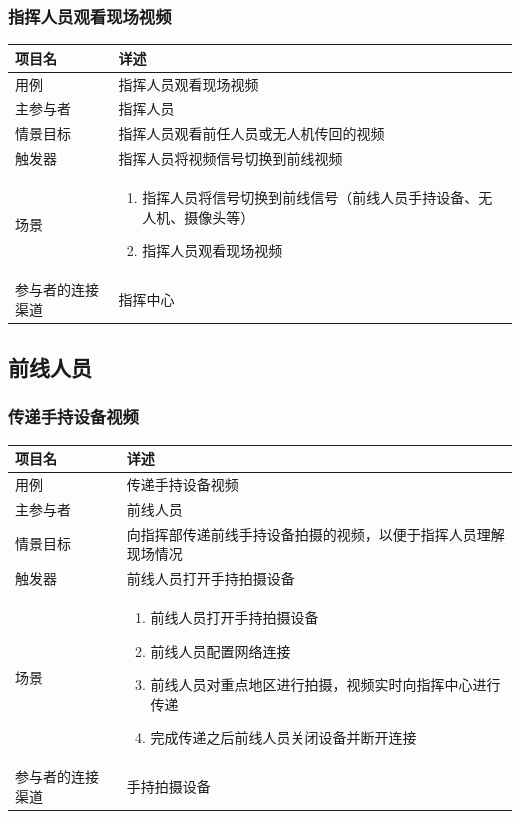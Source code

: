 \documentclass{ctexrep}
\begin{document}
\subsubsection{指挥人员观看现场视频}
\begin{longtable}{p{2cm} | p{10cm}}
\hline
项目名 & 详述 \\
\hline
\hline
用例 & 指挥人员观看现场视频\\
\hline
主参与者 & 指挥人员 \\
\hline
情景目标 &  指挥人员观看前任人员或无人机传回的视频\\
\hline
触发器 &  指挥人员将视频信号切换到前线视频\\
\hline
场景 & \begin{enumerate}
	\item 指挥人员将信号切换到前线信号（前线人员手持设备、无人机、摄像头等）
	\item 指挥人员观看现场视频
\end{enumerate} \\
\hline
参与者的连接渠道 & 指挥中心 \\
\hline
\end{longtable}


\subsection{前线人员}

\subsubsection{传递手持设备视频}
\begin{longtable}{p{2cm} | p{10cm}}
\hline
项目名 & 详述 \\
\hline
\hline
用例 & 传递手持设备视频 \\
\hline
主参与者 & 前线人员  \\
\hline
情景目标 & 向指挥部传递前线手持设备拍摄的视频，以便于指挥人员理解现场情况 \\
\hline
触发器 & 前线人员打开手持拍摄设备 \\
\hline
场景 & \begin{enumerate}
	\item 前线人员打开手持拍摄设备
	\item 前线人员配置网络连接
	\item 前线人员对重点地区进行拍摄，视频实时向指挥中心进行传递
	\item 完成传递之后前线人员关闭设备并断开连接
\end{enumerate} \\
\hline
参与者的连接渠道 & 手持拍摄设备 \\
\hline
\end{longtable}
\end{document}
